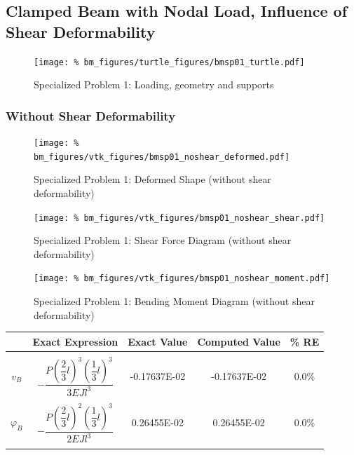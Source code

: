 \clearpage
%
%
\lstset{basicstyle=\ttfamily\scriptsize, columns=fullflexible, keepspaces=true}
%
%
\subsection{Clamped Beam with Nodal Load, Influence of Shear Deformability}
\begin{figure}[h]
    \texttt{[image: \%
                            bm\_figures/turtle\_figures/bmsp01\_turtle.pdf]}
    \centering
    \caption{Specialized Problem 1: Loading, geometry and supports}
    \label{fig:bmsp01_turtle}
\end{figure}
%
%
\subsubsection{Without Shear Deformability}


\begin{figure}[!htb]
    \texttt{[image: \%
                     bm\_figures/vtk\_figures/bmsp01\_noshear\_deformed.pdf]}
    \centering
    \caption{Specialized Problem 1: Deformed Shape (without shear deformability)}
    \label{fig:bmsp01_noshear_deformed}
\end{figure}
\begin{figure}[!htb]
    \texttt{[image: \%
                     bm\_figures/vtk\_figures/bmsp01\_noshear\_shear.pdf]}
    \centering
    \caption{Specialized Problem 1: Shear Force Diagram (without shear deformability)}
    \label{fig:bmsp01_noshear_shear}
\end{figure}
\begin{figure}[!htb]
    \texttt{[image: \%
                     bm\_figures/vtk\_figures/bmsp01\_noshear\_moment.pdf]}
    \centering
    \caption{Specialized Problem 1: Bending Moment Diagram (without shear deformability)}
    \label{fig:bmsp01_noshear_moment}
\end{figure}
\begin{table}[h!]
\centering
\begin{tabular}{ c| c c c c }
    & Exact Expression & Exact Value & Computed Value & \% RE \\ \hline \\
    $v_B$  & $-\dfrac{P(\dfrac{2}{3}l)^3(\dfrac{1}{3}l)^3}{3EJl^3}$ & -0.17637E-02 & -0.17637E-02 & 0.0\% \\ \\
    $\varphi_B$ & $-\dfrac{P(\dfrac{2}{3}l)^2(\dfrac{1}{3}l)^3}{2EJl^3}$ & 0.26455E-02 & 0.26455E-02 & 0.0\% \\ \\
\end{tabular}
\end{table}
%
%
